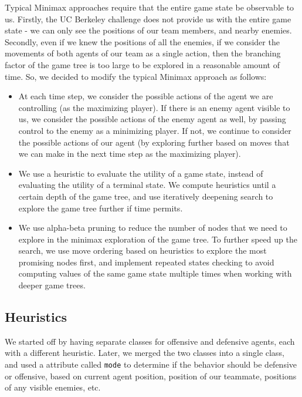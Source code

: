\documentclass[a4paper,12pt]{article}
\begin{document}
Typical Minimax approaches require that the entire game state be observable to us. Firstly, the UC Berkeley challenge does not provide us with the entire game state - we can only see the positions of our team members, and nearby enemies. Secondly, even if we knew the positions of all the enemies, if we consider the movements of both agents of our team as a single action, then the branching factor of the game tree is too large to be explored in a reasonable amount of time. So, we decided to modify the typical Minimax approach as follows:

\begin{itemize}
  \item At each time step, we consider the possible actions of the agent we are controlling (as the maximizing player). If there is an enemy agent visible to us, we consider the possible actions of the enemy agent as well, by passing control to the enemy as a minimizing player. If not, we continue to consider the possible actions of our agent (by exploring further based on moves that we can make in the next time step as the maximizing player).
  \item We use a heuristic to evaluate the utility of a game state, instead of evaluating the utility of a terminal state. We compute heuristics until a certain depth of the game tree, and use iteratively deepening search to explore the game tree further if time permits.
  \item We use alpha-beta pruning to reduce the number of nodes that we need to explore in the minimax exploration of the game tree. To further speed up the search, we use move ordering based on heuristics to explore the most promising nodes first, and implement repeated states checking to avoid computing values of the same game state multiple times when working with deeper game trees.
\end{itemize}

\subsection{Heuristics}
\label{subsec:heuristics}

We started off by having separate classes for offensive and defensive agents, each with a different heuristic. Later, we merged the two classes into a single class, and used a attribute called \texttt{mode} to determine if the behavior should be defensive or offensive, based on current agent position, position of our teammate, positions of any visible enemies, etc.
\end{document}
